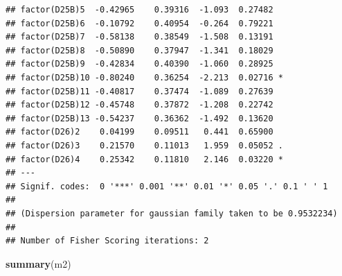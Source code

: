 \documentclass[
]{article}
\newenvironment{Shaded}{\begin{snugshade}}{\end{snugshade}}
\newcommand{\FunctionTok}[1]{\textcolor[rgb]{0.13,0.29,0.53}{\textbf{#1}}}
\newcommand{\NormalTok}[1]{#1}
\begin{document}
\begin{verbatim}
## factor(D25B)5  -0.42965    0.39316  -1.093  0.27482   
## factor(D25B)6  -0.10792    0.40954  -0.264  0.79221   
## factor(D25B)7  -0.58138    0.38549  -1.508  0.13191   
## factor(D25B)8  -0.50890    0.37947  -1.341  0.18029   
## factor(D25B)9  -0.42834    0.40390  -1.060  0.28925   
## factor(D25B)10 -0.80240    0.36254  -2.213  0.02716 * 
## factor(D25B)11 -0.40817    0.37474  -1.089  0.27639   
## factor(D25B)12 -0.45748    0.37872  -1.208  0.22742   
## factor(D25B)13 -0.54237    0.36362  -1.492  0.13620   
## factor(D26)2    0.04199    0.09511   0.441  0.65900   
## factor(D26)3    0.21570    0.11013   1.959  0.05052 . 
## factor(D26)4    0.25342    0.11810   2.146  0.03220 * 
## ---
## Signif. codes:  0 '***' 0.001 '**' 0.01 '*' 0.05 '.' 0.1 ' ' 1
## 
## (Dispersion parameter for gaussian family taken to be 0.9532234)
## 
## Number of Fisher Scoring iterations: 2
\end{verbatim}

\begin{Shaded}
\begin{Highlighting}[]
\FunctionTok{summary}\NormalTok{(m2)}
\end{Highlighting}
\end{Shaded}
\end{document}
